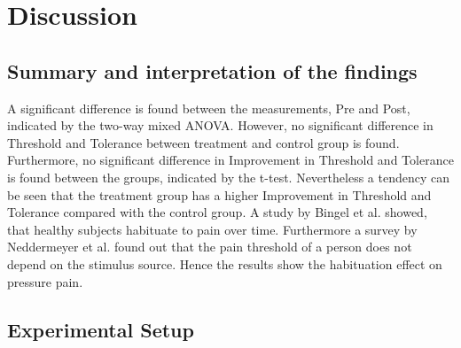 \section{Discussion}

\subsection{Summary and interpretation of the findings}

A significant difference is found between the measurements, Pre and Post, indicated by the two-way mixed ANOVA. However, no significant
difference in Threshold and Tolerance between treatment and control group is found. Furthermore, no significant difference in Improvement in Threshold and Tolerance is found between the groups, indicated by the t-test. Nevertheless a tendency can be seen that the treatment group has a higher Improvement in Threshold and Tolerance compared with the control group. A study by Bingel et al. \cite{Bingel2007} showed, that healthy subjects habituate to pain over time.  Furthermore a survey by Neddermeyer et al. \cite{Neddermeyer2007} found out that the pain threshold of a person does not depend on the stimulus source. Hence the results show the habituation effect on pressure pain.

\subsection{Experimental Setup}

